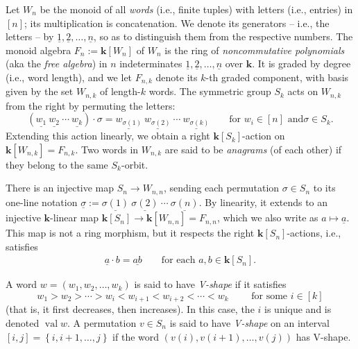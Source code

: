 \documentclass[submission]{FPSAC2026}
\newcommand{\kk}{\mathbf{k}} %
\newcommand{\tup}[1]{\left( #1 \right)}
\newcommand{\ive}[1]{\left[ #1 \right]}
\begin{document}
Let $W_{n}$ be the monoid of all \emph{words} (i.e., finite tuples) with
letters (i.e., entries) in $\left[  n\right]  $; its multiplication is
concatenation. We denote its generators -- i.e., the letters -- by $\underline{1}%
,\underline{2},\ldots,\underline{n}$, so as to distinguish them from the
respective numbers. The monoid algebra $F_n := \kk \left[  W_{n}\right]  $ of
$W_{n}$ is the ring of \emph{noncommutative polynomials} (aka the \emph{free
algebra}) in $n$ indeterminates
$\underline{1},\underline{2},\ldots,\underline{n}$ over $\kk$.
It is graded by degree (i.e., word length),
and we let $F_{n,k}$ denote its $k$-th graded component, with basis given by
the set $W_{n,k}$ of length-$k$ words. The symmetric group $S_{k}$ acts on
$W_{n,k}$ from the right by permuting the letters:%
\[
\left(  \underline{w_{1}}\ \underline{w_{2}}\ \cdots\ \underline{w_{k}%
}\right)  \cdot\sigma=\underline{w_{\sigma\left(  1\right)  }}%
\ \underline{w_{\sigma\left(  2\right)  }}\ \cdots\ \underline{w_{\sigma
\left(  k\right)  }}\qquad\text{for }w_{i}\in\left[  n\right]  \text{ and
}\sigma\in S_{k}.
\]
Extending this action linearly, we obtain a right $\kk \left[
S_{k}\right]  $-action on $\kk \left[  W_{n,k}\right] = F_{n,k}$.
Two words in
$W_{n,k}$ are said to be \emph{anagrams} (of each other) if they belong to the
same $S_{k}$-orbit.

There is an injective map $S_{n}\rightarrow W_{n,n}$, sending each permutation
$\sigma\in S_{n}$ to its one-line notation $\underline{\sigma}%
:=\underline{\sigma\left(  1\right)  }\ \underline{\sigma\left(  2\right)
}\ \cdots\ \underline{\sigma\left(  n\right)  }$. By linearity, it extends to
an injective $\kk$-linear map $\kk \left[  S_{n}\right]
\rightarrow \kk \left[  W_{n,n}\right]  = F_{n,n}$, which we also write as
$a\mapsto\underline{a}$. This map is not a ring morphism, but it respects the
right $\kk \left[  S_{n}\right]  $-actions, i.e., satisfies%
\begin{align}
\underline{a}\cdot b=\underline{ab}\qquad\text{for each }a,b\in
\kk \left[  S_{n}\right]  \text{.}
\label{eq.OLN-equivariant}
\end{align}


A word $w=\left(  w_{1},w_{2},\ldots,w_{k}\right)  $ is said to have
\emph{V-shape} if it satisfies
\[
w_{1}>w_{2}>\cdots>w_{i}<w_{i+1}<w_{i+2}<\cdots<w_k
\qquad \text{ for some } i \in \ive{k}
\]
(that is, it first decreases, then increases). In this case, the $i$ is unique
and is denoted $\operatorname*{val}w$. A permutation $v\in S_n$ is said to
have \emph{V-shape} on an interval $[i, j] =
\left\{  i,i+1,\ldots,j\right\}  $ if the
word $\tup{ v\tup{i}, v\tup{i+1}, \ldots, v\tup{j} }$ has V-shape.
\end{document}
